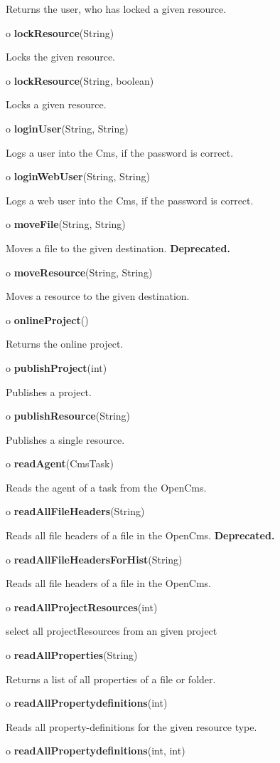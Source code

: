 \begin{description}
Returns the user, who has locked a given resource.  
\item o {\bf lockResource}(String)  

Locks the given resource.  
\item o {\bf lockResource}(String, boolean)  

Locks a given resource.  
\item o {\bf loginUser}(String, String)  

Logs a user into the Cms, if the password is correct.  
\item o {\bf loginWebUser}(String, String)  

Logs a web user into the Cms, if the password is correct.  
\item o {\bf moveFile}(String, String)  

Moves a file to the given destination. {\bf Deprecated.}  
\item o {\bf moveResource}(String, String)  

Moves a resource to the given destination.  
\item o {\bf onlineProject}()  

Returns the online project.  
\item o {\bf publishProject}(int)  

Publishes a project.  
\item o {\bf publishResource}(String)  

Publishes a single resource.  
\item o {\bf readAgent}(CmsTask)  

Reads the agent of a task from the OpenCms.  
\item o {\bf readAllFileHeaders}(String)  

Reads all file headers of a file in the OpenCms. {\bf Deprecated.}  
\item o {\bf readAllFileHeadersForHist}(String)  

Reads all file headers of a file in the OpenCms.  
\item o {\bf readAllProjectResources}(int)  

select all projectResources from an given project  
\item o {\bf readAllProperties}(String)  

Returns a list of all properties of a file or folder.  
\item o {\bf readAllPropertydefinitions}(int)  

Reads all property-definitions for the given resource type.  
\item o {\bf readAllPropertydefinitions}(int, int)  


\end{description}
